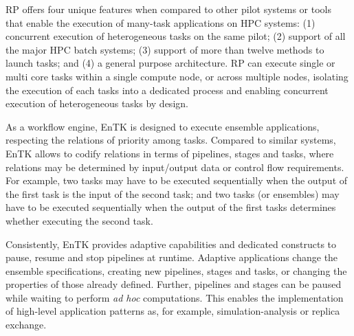 \documentclass[preprint,12pt, a4paper]{elsarticle}
\begin{document}
RP offers four unique features when compared to other pilot systems or tools
that enable the execution of many-task applications on HPC systems: (1)
concurrent execution of heterogeneous tasks on the same pilot; (2) support of
all the major HPC batch systems; (3) support of more than twelve methods to
launch tasks; and (4) a general purpose architecture. RP can execute single
or multi core tasks within a single compute node, or across multiple nodes,
isolating the execution of each tasks into a dedicated process and enabling
concurrent execution of heterogeneous tasks by design.


As a workflow engine, EnTK is designed to execute ensemble applications,
respecting the relations of priority among tasks. Compared to similar
systems, EnTK allows to codify relations in terms of pipelines, stages and
tasks, where relations may be determined by input/output data or control flow
requirements. For example, two tasks may have to be executed sequentially
when the output of the first task is the input of the second task; and two
tasks (or ensembles) may have to be executed sequentially when the output of
the first tasks determines whether executing the second task.

Consistently, EnTK provides adaptive capabilities and dedicated constructs to
pause, resume and stop pipelines at runtime. Adaptive applications change the
ensemble specifications, creating new pipelines, stages and tasks, or
changing the properties of those already defined. Further, pipelines and
stages can be paused while waiting to perform \textit{ad hoc} computations.
This enables the implementation of high-level application patterns as, for
example, simulation-analysis or replica exchange.




\end{document}
